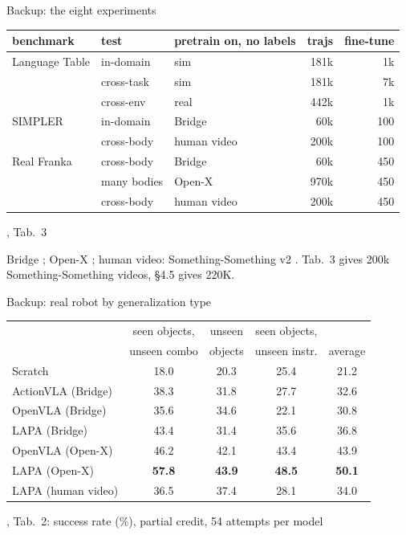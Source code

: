 \documentclass[aspectratio=169,12pt]{beamer}
\newcommand{\src}[1]{{\scriptsize\color{mute}\citep{#1}}}
\newcommand{\credit}[1]{\par\hfill{\tiny\color{mute}\citet{ye2025lapa}, #1}\par}
\newcommand{\lapa}[1]{{\color{lapa}#1}}
\begin{document}
\begin{frame}{Backup: the eight experiments}
  \centering
  {\scriptsize
  \setlength{\tabcolsep}{8pt}
  \renewcommand{\arraystretch}{1.05}
  \begin{tabular}{@{}lllrr@{}}
    \toprule
    benchmark & test & pretrain on, no labels & trajs & fine-tune \\
    \midrule
    Language Table \src{lynch2023language} & in-domain & sim & 181k & 1k \\
      & cross-task & sim & 181k & 7k \\
      & cross-env & real & 442k & 1k \\
    SIMPLER \src{li2024simpler} & in-domain & Bridge & 60k & 100 \\
      & cross-body & human video & 200k & 100 \\
    Real Franka & cross-body & Bridge & 60k & 450 \\
      & many bodies & Open-X & 970k & 450 \\
      & cross-body & human video & 200k & 450 \\
    \bottomrule
  \end{tabular}}
  \credit{Tab.~3}
  {\tiny\color{mute} Bridge \citep{walke2023bridge}; Open-X \citep{oxe2023};
    human video: Something-Something v2 \citep{goyal2017something}.
    Tab.~3 gives 200k Something-Something videos, \S4.5 gives 220K.\par}
\end{frame}

\begin{frame}{Backup: real robot by generalization type}
  \centering\small
  \setlength{\tabcolsep}{8pt}
  \begin{tabular}{@{}lcccc@{}}
    \toprule
    & seen objects, & unseen & seen objects, & \\
    & unseen combo & objects & unseen instr. & average \\
    \midrule
    Scratch & 18.0 & 20.3 & 25.4 & 21.2 \\
    \midrule
    ActionVLA (Bridge) & 38.3 & 31.8 & 27.7 & 32.6 \\
    OpenVLA (Bridge) & 35.6 & 34.6 & 22.1 & 30.8 \\
    \lapa{LAPA (Bridge)} & 43.4 & 31.4 & 35.6 & 36.8 \\
    \midrule
    OpenVLA (Open-X) & 46.2 & 42.1 & 43.4 & 43.9 \\
    \lapa{LAPA (Open-X)} & \textbf{57.8} & \textbf{43.9} & \textbf{48.5} & \textbf{50.1} \\
    \midrule
    \lapa{LAPA (human video)} & 36.5 & 37.4 & 28.1 & 34.0 \\
    \bottomrule
  \end{tabular}
  \credit{Tab.~2: success rate (\%), partial credit, 54 attempts per model}
\end{frame}
\end{document}
